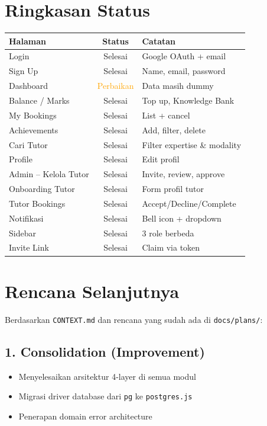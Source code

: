 \documentclass[11pt,a4paper]{article}
\begin{document}
\section*{Ringkasan Status}

\begin{center}
\begin{longtable}{|L{5cm}|c|L{5cm}|}
\hline
\textbf{Halaman} & \textbf{Status} & \textbf{Catatan} \\
\hline
Login & Selesai & Google OAuth + email \\
Sign Up & Selesai & Name, email, password \\
Dashboard & \textcolor{orange}{Perbaikan} & Data masih dummy \\
Balance / Marks & Selesai & Top up, Knowledge Bank \\
My Bookings & Selesai & List + cancel \\
Achievements & Selesai & Add, filter, delete \\
Cari Tutor & Selesai & Filter expertise \& modality \\
Profile & Selesai & Edit profil \\
Admin -- Kelola Tutor & Selesai & Invite, review, approve \\
Onboarding Tutor & Selesai & Form profil tutor \\
Tutor Bookings & Selesai & Accept/Decline/Complete \\
Notifikasi & Selesai & Bell icon + dropdown \\
Sidebar & Selesai & 3 role berbeda \\
Invite Link & Selesai & Claim via token \\
\hline
\end{longtable}
\end{center}

\vspace{1em}

\section*{Rencana Selanjutnya}

Berdasarkan \texttt{CONTEXT.md} dan rencana yang sudah ada di \texttt{docs/plans/}:

\subsection*{1. Consolidation (Improvement)}
\begin{itemize}
    \item Menyelesaikan arsitektur 4-layer di semua modul
    \item Migrasi driver database dari \texttt{pg} ke \texttt{postgres.js}
    \item Penerapan domain error architecture
\end{itemize}
\end{document}
